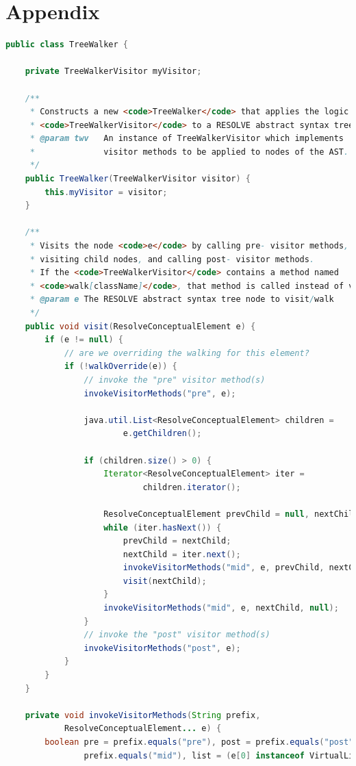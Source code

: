 \documentclass[times]{speauth}
\begin{document}
\section{Appendix} \label{app:codelistings}
\begin{lstlisting}[language=java,caption={TreeWalker.java}]
public class TreeWalker {

    private TreeWalkerVisitor myVisitor;

    /**
     * Constructs a new <code>TreeWalker</code> that applies the logic of
     * <code>TreeWalkerVisitor</code> to a RESOLVE abstract syntax tree.
     * @param twv	An instance of TreeWalkerVisitor which implements
     * 				visitor methods to be applied to nodes of the AST.
     */
    public TreeWalker(TreeWalkerVisitor visitor) {
        this.myVisitor = visitor;
    }

    /**
     * Visits the node <code>e</code> by calling pre- visitor methods, recursively
     * visiting child nodes, and calling post- visitor methods.
     * If the <code>TreeWalkerVisitor</code> contains a method named
     * <code>walk[className]</code>, that method is called instead of visiting the children.
     * @param e	The RESOLVE abstract syntax tree node to visit/walk
     */
    public void visit(ResolveConceptualElement e) {
        if (e != null) {
            // are we overriding the walking for this element?
            if (!walkOverride(e)) {
                // invoke the "pre" visitor method(s)
                invokeVisitorMethods("pre", e);

                java.util.List<ResolveConceptualElement> children =
                        e.getChildren();

                if (children.size() > 0) {
                    Iterator<ResolveConceptualElement> iter =
                            children.iterator();

                    ResolveConceptualElement prevChild = null, nextChild = null;
                    while (iter.hasNext()) {
                        prevChild = nextChild;
                        nextChild = iter.next();
                        invokeVisitorMethods("mid", e, prevChild, nextChild);
                        visit(nextChild);
                    }
                    invokeVisitorMethods("mid", e, nextChild, null);
                }
                // invoke the "post" visitor method(s)
                invokeVisitorMethods("post", e);
            }
        }
    }

    private void invokeVisitorMethods(String prefix,
            ResolveConceptualElement... e) {
        boolean pre = prefix.equals("pre"), post = prefix.equals("post"), mid =
                prefix.equals("mid"), list = (e[0] instanceof VirtualListNode);


\end{lstlisting}
\end{document}

